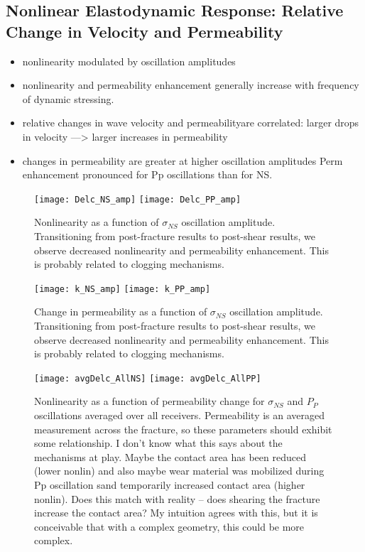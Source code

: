 \documentclass[letterpaper,10pt]{article}
\begin{document}


\subsection{Nonlinear Elastodynamic Response: Relative Change in Velocity and Permeability}
\begin{itemize}
	\item nonlinearity modulated by oscillation amplitudes
\item nonlinearity and permeability enhancement generally increase with frequency of dynamic stressing.
\item relative changes in wave velocity and permeabilityare correlated: larger drops in velocity —> larger increases in permeability
\item changes in permeability are greater at higher oscillation amplitudes 
\subitem Perm enhancement pronounced for Pp oscillations than for NS.
\end{itemize}


\begin{figure}[ht]
	\centering
	\texttt{[image: Delc\_NS\_amp]}
	\texttt{[image: Delc\_PP\_amp]}
	\caption{Nonlinearity as a function of $ \sigma_{NS} $ oscillation amplitude. Transitioning from post-fracture results to post-shear results, we observe decreased nonlinearity and permeability enhancement. This is probably related to clogging mechanisms.}%
	\label{fig:delc_ns_amp}
\end{figure}

\newpage

\begin{figure}[ht]
	\centering
	\texttt{[image: k\_NS\_amp]}
	\texttt{[image: k\_PP\_amp]}
	\caption{Change in permeability as a function of $ \sigma_{NS} $ oscillation amplitude. Transitioning from post-fracture results to post-shear results, we observe decreased nonlinearity and permeability enhancement. This is probably related to clogging mechanisms.}%
	\label{fig:perm_ns_amp}
\end{figure}

\newpage


\begin{figure}[ht]
	\centering
	\texttt{[image: avgDelc\_AllNS]}
	\texttt{[image: avgDelc\_AllPP]}
	\caption{Nonlinearity as a function of permeability change for $ \sigma_{NS} $ and $ P_P $ oscillations averaged over all receivers. Permeability is an averaged measurement across the fracture, so these parameters should exhibit some relationship. I don’t know what this says about the mechanisms at play. Maybe the contact area has been reduced (lower nonlin) and also maybe wear material was mobilized during Pp oscillation sand temporarily increased contact area (higher nonlin). Does this match with reality -- does shearing the fracture increase the contact area? My intuition agrees with this, but it is conceivable that with a complex geometry, this could be more complex.}
	\label{fig:delc_plots2}
\end{figure}
\end{document}
